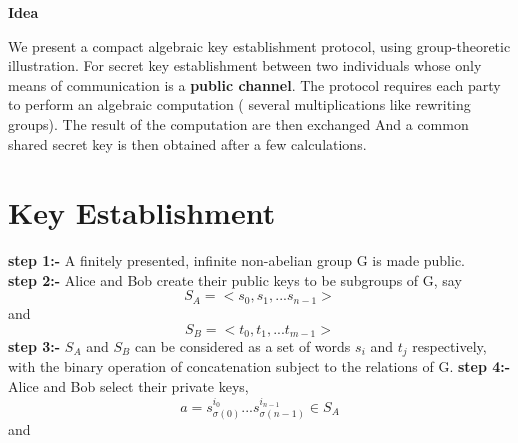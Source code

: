 \documentclass[12pt]{article}
\begin{document}
     \textbf{Idea}\\
      \begin{block}
       We present a compact algebraic key establishment protocol, using group-theoretic illustration.
       For secret key establishment between two individuals whose only means of communication is a \textbf{public channel}.
     The protocol requires each party to perform an algebraic computation ( several multiplications like rewriting groups).
      The result of the computation are then exchanged
      And a common shared secret key is then obtained after a few calculations. 
      \end{block}
    
     \section{Key Establishment }
     \vspace{2mm}
     \textbf{step 1:-} A finitely presented, infinite non-abelian group G is made public.\\
    \textbf{step 2:-} Alice and Bob create their    public keys to be subgroups of G, say
    $$S_A=<s_0,s_1,...s_{n-1}>$$ and $$  S_B=<t_0,t_1,...t_{m-1}>$$
    \textbf{step 3:-} $S_A$ and $S_B $ can be     considered as a set of words $s_i$ and $t_j$  respectively, with the binary operation of    concatenation subject to the relations of G.
    \textbf{step 4:-} Alice and Bob select their private keys,\\
      
      $$a=s^{i_0}_{\sigma(0)}...s^{i_{n-1}}_{\sigma(n-1)} \in S_A$$ and
      
\end{document}
